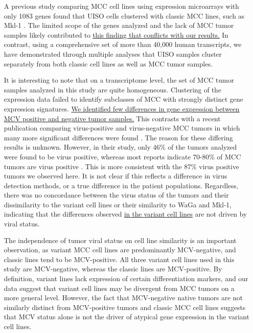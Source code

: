 \documentclass[10pt]{article}
\begin{document}
A previous study comparing MCC cell lines using expression microarrays with only 1083 genes found that UISO cells clustered with classic MCC lines, such as Mkl-1 \citep{VanGele2004Geneexpression}.
The limited scope of the genes analyzed and the lack of MCC tumor samples likely contributed to \uline{this finding that conflicts with our results.}
In contrast, using a comprehensive set of more than 40,000 human transcripts, we have demonstrated through multiple analyses that UISO samples cluster separately from both classic cell lines as well as MCC tumor samples.

It is interesting to note that on a transcriptome level, the set of MCC tumor samples analyzed in this study are quite homogeneous.
Clustering of the expression data failed to identify subclasses of MCC with strongly distinct gene expression signatures.
\uline{We identified few differences in gene expression between MCV positive and negative tumor samples.}
This contrasts with a recent publication comparing virus-positive and virus-negative MCC tumors in which many more significant differences were found \citep{Harms2013Distinct}.
The reason for these differing results is unknown.
However, in their study, only 46\% of the tumors analyzed were found to be virus positive, whereas most reports indicate 70-80\% of MCC tumors are virus positive \citep{Pulitzer2009Merkel,Feng2008Clonal}.
This is more consistent with the 87\% virus positive tumors we observed here.
It is not clear if this reflects a difference in virus detection methods, or a true difference in the patient populations.
Regardless, there was no concordance between the virus status of the tumors and their dissimilarity to the variant cell lines or their similarity to WaGa and Mkl-1, indicating that the differences observed \uline{in the variant cell lines} are not driven by viral status.

The independence of tumor viral status on cell line similarity is an important observation, as variant MCC cell lines are predominantly MCV-negative, and classic lines tend to be MCV-positive. 
All three variant cell lines used in this study are MCV-negative, whereas the classic lines are MCV-positive.
By definition, variant lines lack expression of certain differentiation markers, and our data suggest that variant cell lines may be divergent from MCC tumors on a more general level. 
However, the fact that MCV-negative native tumors are not similarly distinct from MCV-positive tumors and classic MCC cell lines suggests that MCV status alone is not the driver of atypical gene expression in the variant cell lines.
\end{document}
